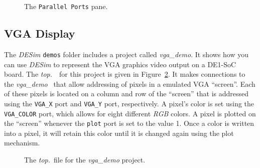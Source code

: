 {\begin{figure}[h]
	\begin{center}
        \setlength{\fboxsep}{0pt}
	\end{center}
          \caption{The \texttt{Parallel Ports} pane.}
	\label{fig:gpio_pane}
\end{figure}

\subsection{VGA Display}

The {\it DESim} \texttt{demos} folder includes a project called {\it vga\_demo}. It shows how 
you can use {\it DESim} to represent the VGA graphics video output on a DE1-SoC board.
The {\it top.\hdlFileExt}~\hdlModuleName~for this project is given in Figure~\ref{fig:vga}. It makes
connections to the {\it vga\_demo} \hdlModuleName~that allow addressing of pixels in a
emulated VGA ``screen''. Each of these pixels is located on a column and row of the 
``screen'' that is addressed using the \texttt{VGA\_X} port and \texttt{VGA\_Y} port,
respectively. A pixel's color is set using the \texttt{VGA\_COLOR} port, which allows for 
eight different {\it RGB} colors.  A pixel is plotted on the ``screen'' whenever the 
\texttt{plot} port is set to the value 1. Once a color is written into a pixel, it will
retain this color until it is changed again using the plot mechanism.

\begin{figure}[h]
\begin{center}
\begin{minipage}[h]{16 cm}
	{}
	{}
\end{minipage}
	\caption{The {\it top.\hdlFileExt}~file for the {\it vga\_demo} project.}
	\label{fig:vga}
\end{center}
\end{figure}

}
